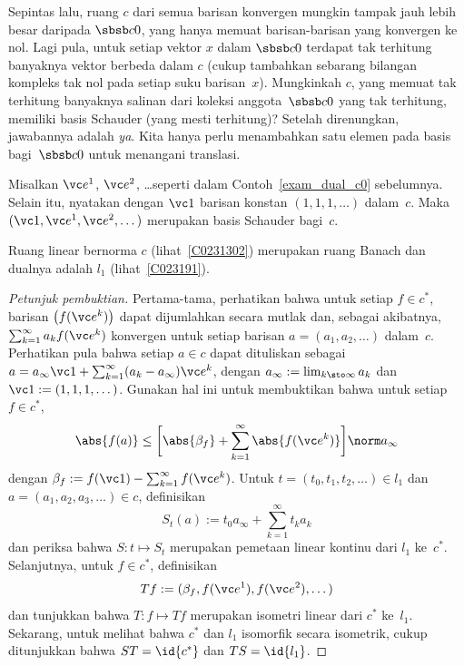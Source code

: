 Sepintas lalu, ruang $c$ dari semua barisan konvergen mungkin tampak jauh lebih besar daripada $\sbsb c0$,
yang hanya memuat barisan-barisan yang konvergen ke nol. Lagi pula, untuk setiap vektor
$x$ dalam $\sbsb c0$ terdapat tak terhitung banyaknya vektor berbeda dalam $c$ (cukup tambahkan sebarang bilangan kompleks
tak nol pada setiap suku barisan~$x$). Mungkinkah $c$, yang memuat tak terhitung banyaknya
salinan dari koleksi anggota~$\sbsb c0$ yang tak terhitung, memiliki basis Schauder (yang mesti terhitung)?
Setelah direnungkan, jawabannya adalah \emph{ya}. Kita hanya perlu menambahkan satu elemen
pada basis bagi~$\sbsb c0$ untuk menangani translasi.

\begin{exam} Misalkan $\vc e^1$, $\vc e^2$, \dots seperti dalam Contoh~\ref{exam_dual_c0} sebelumnya. Selain itu,
nyatakan dengan $\vc 1$ barisan konstan $(1,1,1,\dots)$ dalam~$c$. Maka $(\vc 1, \vc e^1, \vc e^2, \dots)$
merupakan basis Schauder bagi~$c$.
\end{exam}

\begin{exam}\label{exam_dual_c} Ruang linear bernorma $c$ (lihat~\ref{C0231302})
merupakan ruang Banach dan dualnya adalah $l_1$ (lihat~\ref{C023191}).
\end{exam}

\begin{proof}[\emph{Petunjuk pembuktian}]
\leavevmode\par\noindent
Pertama-tama, perhatikan bahwa untuk setiap $f \in c^*$, barisan
$\bigl(f(\vc e^k)\bigr)$ dapat dijumlahkan secara mutlak dan, sebagai akibatnya, $\sum_{k=1}^\infty a_k f(\vc e^k)$
konvergen untuk setiap barisan $a = (a_1,a_2,\dots)$ dalam~$c$. Perhatikan pula bahwa setiap $a \in c$ dapat dituliskan sebagai
$a = a_\infty \vc 1 + \sum_{k=1}^\infty (a_k -a_\infty)\vc e^k$, dengan $a_\infty := \lim_{k \sto \infty}a_k$
dan $\vc 1 := (1,1,1,\dots)$. Gunakan hal ini untuk membuktikan bahwa untuk setiap $f \in c^*$,
   \[ \abs{f(a)} \le \biggl[ \abs{\beta_f} + \sum_{k=1}^\infty \abs{f(\vc e^k)} \biggr] {\norm a}_\infty \]
dengan $\beta_f := f(\vc 1) - \sum_{k=1}^\infty f(\vc e^k)$. Untuk $t = (t_0,t_1,t_2,\dots) \in l_1$ dan
$a = (a_1,a_2,a_3,\dots) \in c$, definisikan
   \[ S_t(a) := t_0 a_\infty + \sum_{k=1}^\infty t_ka_k \]
dan periksa bahwa $S\colon t \mapsto S_t$ merupakan pemetaan linear kontinu dari $l_1$ ke~$c^*$.
Selanjutnya, untuk $f \in c^*$, definisikan
   \[ Tf := (\beta_f, f(\vc e^1), f(\vc e^2), \dots) \]
dan tunjukkan bahwa $T\colon f \mapsto Tf$ merupakan isometri linear dari $c^*$ ke~$l_1$. Sekarang, untuk melihat bahwa $c^*$ dan
$l_1$ isomorfik secara isometrik, cukup ditunjukkan bahwa $ST = \id{c^*}$ dan $TS = \id{l_1}$.  \ns
\end{proof}












